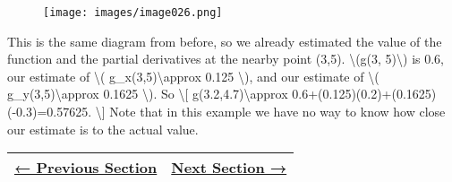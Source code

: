 \begin{figure}
\centering
\texttt{[image: images/image026.png]}
\caption{}
\end{figure}

This is the same diagram from before, so we already estimated the value
of the function and the partial derivatives at the nearby point (3,5).
\textbackslash{}(g(3, 5)\textbackslash{}) is 0.6, our estimate of
\textbackslash{}( g\_x(3,5)\textbackslash{}approx 0.125
\textbackslash{}), and our estimate of \textbackslash{}(
g\_y(3,5)\textbackslash{}approx 0.1625 \textbackslash{}). So
\textbackslash{}{[} g(3.2,4.7)\textbackslash{}approx
0.6+(0.125)(0.2)+(0.1625)(-0.3)=0.57625. \textbackslash{}{]} Note that
in this example we have no way to know how close our estimate is to the
actual value.

\begin{longtable}[]{@{}ll@{}}
\toprule
\endhead
\href{section4-1.php}{← Previous Section} & \href{section4-3.php}{Next
Section →}\tabularnewline
\bottomrule
\end{longtable}
